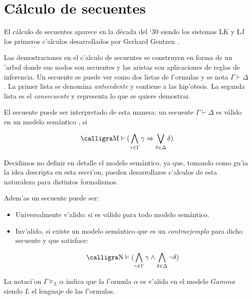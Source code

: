 \section{Cálculo de secuentes} \label{calculo-secuentes}

El cálculo de secuentes aparece en la década del `30 siendo los sistemas LK y LJ los primeros c'alculos desarrollados por Gerhard Gentzen \cite{gentzen1935}.

Las demostraciones en el c'alculo de secuentes se construyen en forma de un 'arbol donde sus nodos son secuentes y las aristas son aplicaciones de reglas de inferencia. Un secuente se puede ver como dos listas de f'ormulas y se nota $ \Gamma \vdash  \Delta$. La primer lista se denomina \textit{antecedente} y contiene a las hip'otesis. La segunda lista es el \textit{consecuente} y representa lo que se quiere demostrar.

El secuente puede ser interpretado de esta manera: un secuente $\Gamma \vdash  \Delta$ es válido en un modelo semántico , si 

\begin{figure}[ht]
\begin{equation}
\textrm{\sem{M}} \vDash (\bigwedge_{\gamma \in \Gamma} \gamma \Rightarrow \bigvee_{\delta \in \Delta} \delta )
\notag
\end{equation}
\end{figure}

Decidimos no definir en detalle el modelo semántico, ya que, tomando como gu'ia la idea descripta en esta secci'on, pueden desarrollarse c'alculos de esta naturaleza para distintos formalismos.

Adem'as un secuente puede ser:

\begin{itemize}

\item{Universalmente v'alido}: si es válido para todo modelo semántico.
\item{Inv'alido}, si existe un modelo semántico  que es un \emph{contraejemplo} para dicho secuente y que satisface:

\begin{equation}
\textrm{\sem{N}} \vDash (\bigwedge_{\gamma \in \Gamma} \gamma \wedge \bigwedge_{\delta \in \Delta} \neg\delta )
\notag
\end{equation}

\end{itemize}

La notaci'on $\Gamma \models_L \alpha$ indica que la f'ormula $\alpha$ es v'alida en el modelo $Gamma$ siendo $L$ el lenguaje de las f'ormulas.

